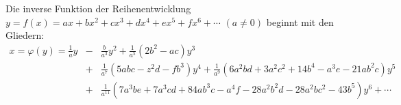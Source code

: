 \documentclass{article}
\begin{document}
Die inverse Funktion der Reihenentwicklung~~$y = f(x) = ax+bx^2+cx^3
+dx^4 + ex^5 + fx^6+\cdots$ $(a\ne0)$ beginnt mit den Gliedern:
\setlength{\arraycolsep}{2pt}
\begin{eqnarray*}
x = \varphi(y) = \frac{1}{a}y &-& \frac{b}{a^3}y^2 + \frac{1}{a^5}(2b^2-ac)y^3\\
   &+&\frac{1}{a^7}(5abc - z^2d -fb^3)y^4 
     +\frac{1}{a^9}(6a^2bd + 3a^2c^2+14b^4 - a^3e - 21ab^2c)y^5\\
   &+&\frac{1}{a^{11}}(7a^3be + 7a^3cd + 84ab^3c - a^4f - 28a^2b^2d
	-28 a^2bc^2 - 43b^5)y^6 + \cdots
\end{eqnarray*}
\end{document}
